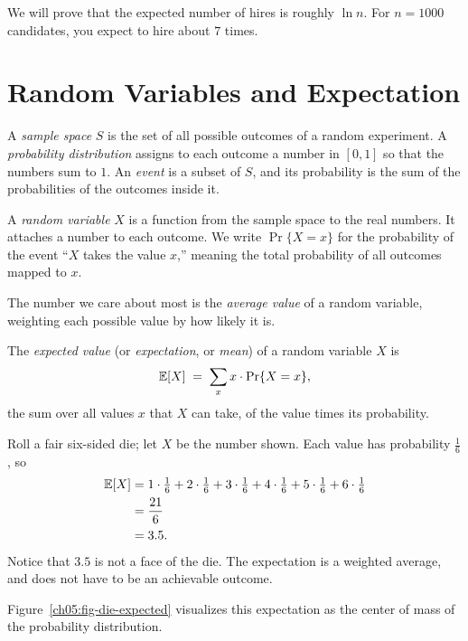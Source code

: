 We will prove that the expected number of hires is roughly $\ln n$. For $n = 1000$ candidates, you expect to hire about $7$ times.

\section{Random Variables and Expectation}

A \emph{sample space} $S$ is the set of all
possible outcomes of a random experiment. A \emph{probability distribution}
assigns to each outcome a number in $[0,1]$ so that the numbers sum to $1$. An
\emph{event} is a subset of $S$, and its probability is the sum of the
probabilities of the outcomes inside it.

\begin{definition}
\label{ch05:def-rv}
A \emph{random variable} $X$ is a function from the sample space to the real
numbers. It attaches a number to each outcome. We write $\Pr\{X = x\}$ for the
probability of the event ``$X$ takes the value $x$,'' meaning the total
probability of all outcomes mapped to $x$.
\end{definition}

The number we care about most is the \emph{average value} of a random variable,
weighting each possible value by how likely it is.

\begin{definition}[Expectation]
\label{ch05:def-exp}
The \emph{expected value} (or \emph{expectation}, or \emph{mean}) of a random
variable $X$ is
\[
  \mathbb{E}[X] \;=\; \sum_{x} x \cdot \Pr\{X = x\},
\]
the sum over all values $x$ that $X$ can take, of the value times its
probability.
\end{definition}

\begin{example}
\label{ch05:ex-die}
Roll a fair six-sided die; let $X$ be the number shown. Each value has
probability $\tfrac16$, so
\begin{align*}
  \mathbb{E}[X] &= 1\cdot\tfrac16 + 2\cdot\tfrac16 + 3\cdot\tfrac16
        + 4\cdot\tfrac16 + 5\cdot\tfrac16 + 6\cdot\tfrac16 \\
        &= \frac{21}{6} \\
        &= 3.5.
\end{align*}
Notice that $3.5$ is not a face of the die. The expectation is a weighted average, and does not have to be an achievable outcome.
\end{example}

Figure~\ref{ch05:fig-die-expected} visualizes this expectation as the center of mass of the probability distribution.

